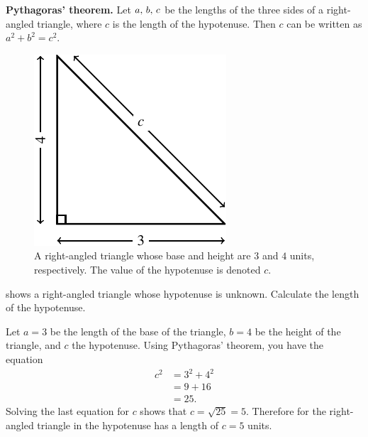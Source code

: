 \documentclass[a4paper,oneside,12pt]{article}
\begin{document}
\begin{theorem}
\textbf{Pythagoras' theorem.}
Let ${a},\, {b},\, {c}$ be the lengths of the three sides of a
right-angled triangle, where $c$ is the length of the hypotenuse.
Then $c$ can be written as $a^2 + b^2 = c^2$.
\end{theorem}

\begin{figure}[!htbp]
\centering
\includegraphics[scale=1.1]{image/03/345-triangle.pdf}
\caption{%
  A right-angled triangle whose base and height are $3$ and $4$ units,
  respectively.  The value of the hypotenuse is denoted $c$.
}
\label{fig:345_triangle}
\end{figure}

\begin{example}
 shows a right-angled triangle whose
hypotenuse is unknown.  Calculate the length of the hypotenuse.
\end{example}

\begin{solution}
Let $a = 3$ be the length of the base of the triangle, $b = 4$ be the
height of the triangle, and $c$ the hypotenuse.  Using Pythagoras'
theorem, you have the equation
\begin{align*}
c^2
&=
3^2 + 4^2 \\[4pt]
&=
9 + 16 \\[4pt]
&=
25.
\end{align*}
Solving the last equation for $c$ shows that $c = \sqrt{25} = 5$.
Therefore for the right-angled triangle in 
the hypotenuse has a length of $c = 5$ units.
\end{solution}
\end{document}
